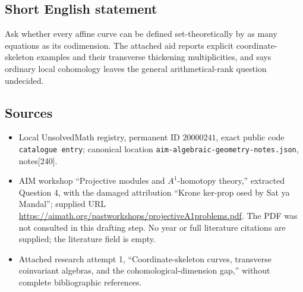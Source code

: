 \documentclass[11pt]{article}
\begin{document}
\subsection{Short English statement}
Ask whether every affine curve can be defined set-theoretically by as many equations as its codimension. The attached aid reports explicit coordinate-skeleton examples and their transverse thickening multiplicities, and says ordinary local cohomology leaves the general arithmetical-rank question undecided.
\subsection{Sources}
\begin{itemize}
\item Local UnsolvedMath registry, permanent ID \(20000241\), exact public code \texttt{catalogue entry}; canonical location \texttt{aim-algebraic-geometry-notes.json}, notes[240].
\item AIM workshop ``Projective modules and \(A^1\)-homotopy theory,'' extracted Question 4, with the damaged attribution ``Krone ker-prop osed by Sat ya Mandal''; supplied URL \url{https://aimath.org/pastworkshops/projectiveA1problems.pdf}. The PDF was not consulted in this drafting step. No year or full literature citations are supplied; the literature field is empty.
\item Attached research attempt 1, ``Coordinate-skeleton curves, transverse coinvariant algebras, and the cohomological-dimension gap,'' without complete bibliographic references.
\end{itemize}
\end{document}
